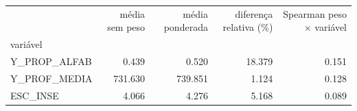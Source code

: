 \begin{tabular}{lrrrr}
\toprule
 & média sem peso & média ponderada & diferença relativa (\%) & Spearman peso × variável \\
variável &  &  &  &  \\
\midrule
Y\_PROP\_ALFAB & 0.439 & 0.520 & 18.379 & 0.151 \\
Y\_PROF\_MEDIA & 731.630 & 739.851 & 1.124 & 0.128 \\
ESC\_INSE & 4.066 & 4.276 & 5.168 & 0.089 \\
\bottomrule
\end{tabular}

